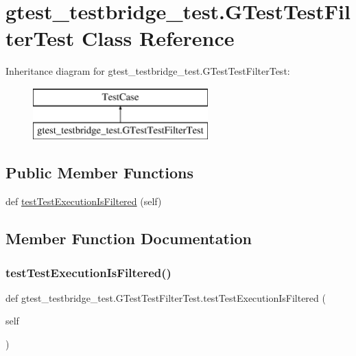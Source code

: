 \hypertarget{classgtest__testbridge__test_1_1_g_test_test_filter_test}{}\section{gtest\+\_\+testbridge\+\_\+test.\+G\+Test\+Test\+Filter\+Test Class Reference}
\label{classgtest__testbridge__test_1_1_g_test_test_filter_test}
Inheritance diagram for gtest\+\_\+testbridge\+\_\+test.\+G\+Test\+Test\+Filter\+Test\+:\begin{figure}[H]
\begin{center}
\leavevmode
\includegraphics[height=2.000000cm]{db/dba/classgtest__testbridge__test_1_1_g_test_test_filter_test}
\end{center}
\end{figure}
\subsection*{Public Member Functions}
\begin{DoxyCompactItemize}
\item 
def \mbox{\hyperlink{classgtest__testbridge__test_1_1_g_test_test_filter_test_af41ae1fea4ec08f5594ad1ae78663d3c}{test\+Test\+Execution\+Is\+Filtered}} (self)
\end{DoxyCompactItemize}


\subsection{Member Function Documentation}
\mbox{\label{classgtest__testbridge__test_1_1_g_test_test_filter_test_af41ae1fea4ec08f5594ad1ae78663d3c}} 
\subsubsection{\texorpdfstring{testTestExecutionIsFiltered()}{testTestExecutionIsFiltered()}}
{\footnotesize\ttfamily def gtest\+\_\+testbridge\+\_\+test.\+G\+Test\+Test\+Filter\+Test.\+test\+Test\+Execution\+Is\+Filtered (\begin{DoxyParamCaption}\item[{}]{self }\end{DoxyParamCaption})}

